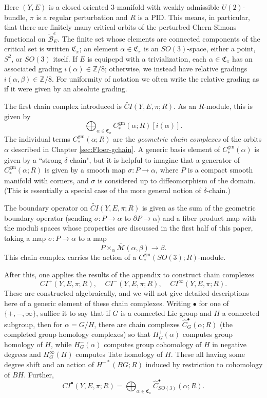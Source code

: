 \documentclass{memo-l}
\theoremstyle{definition}
\theoremstyle{remark}
\numberwithin{section}{chapter}
\numberwithin{equation}{chapter}
\begin{document}
Here $(Y,E)$ is a closed oriented 3-manifold with weakly admissible $U(2)$-bundle, $\pi$ is a regular perturbation and $R$ is a PID. This means, in particular, that there are finitely many critical orbits of the perturbed Chern-Simons functional on $\widetilde{\mathcal B}^e_E$. The finite set whose elements are connected components of the critical set is written $\mathfrak C_\pi$; an element $\alpha \in \mathfrak C_\pi$ is an $SO(3)$-space, either a point, $S^2$, or $SO(3)$ itself. If $E$ is equipepd with a trivialization, each $\alpha \in \mathfrak C_\pi$ has an associated grading $i(\alpha) \in \mathbb Z/8$; otherwise, we instead have relative gradings $i(\alpha, \beta) \in \mathbb Z/8$. For uniformity of notation we often write the relative grading as if it were given by an absolute grading.

The first chain complex introduced is $\widetilde{CI}(Y,E,\pi;R)$. As an $R$-module, this is given by $$\bigoplus_{\alpha \in \mathfrak C_\pi} C_*^{\text{gm}}(\alpha;R)[i(\alpha)].$$ The individual terms $C_*^{\text{gm}}(\alpha;R)$ are the \emph{geometric chain complexes} of the orbits $\alpha$ described in Chapter \ref{sec:Floer-gchain}. A generic basis element of $C_*^{\text{gm}}(\alpha)$ is given by a ``strong $\delta$-chain", but it is helpful to imagine that a generator of $C_*^{\text{gm}}(\alpha;R)$ is given by a smooth map $\sigma: P \to \alpha$, where $P$ is a compact smooth manifold with corners, and $\sigma$ is considered up to diffeomorphism of the domain. (This is essentially a special case of the more general notion of $\delta$-chain.) 

The boundary operator on $\widetilde{CI}(Y,E,\pi;R)$ is given as the sum of the geometric boundary operator (sending $\sigma: P\to \alpha$ to $\partial P \to \alpha$) and a fiber product map with the moduli spaces whose properties are discussed in the first half of this paper, taking a map $\sigma: P \to \alpha$ to a map 
\begin{equation}\label{eqn:fib-moduli}
  P \times_{\alpha} \overline{\mathcal M}(\alpha, \beta) \to \beta. 
\tag{*}
\end{equation}
This chain complex carries the action of a $C_*^{\text{gm}}(SO(3);R)$-module.

After this, one applies the results of the appendix to construct chain complexes $$CI^+(Y,E,\pi;R),\;\;\;\; CI^-(Y,E,\pi;R),\;\;\;\; CI^\infty(Y,E,\pi;R).$$ These are constructed algebraically, and we will not give detailed descriptions here of a generic element of these chain complexes. Writing $\bullet$ for one of $\{+, -, \infty\}$, suffice it to say that if $G$ is a connected Lie group and $H$ a connected subgroup, then for $\alpha = G/H$, there are chain complexes $\hat C^\bullet_G(\alpha;R)$ (the completed group homology complexes) so that $H^+_G(\alpha)$ computes group homology of $H$, while $H^-_G(\alpha)$ computes group cohomology of $H$ in negative degrees and $H^\infty_G(H)$ computes Tate homology of $H$. These all having some degree shift and an action of $H^{-*}(BG;R)$ induced by restriction to cohomology of $BH$. Further, $$CI^\bullet(Y,E,\pi;R) = \bigoplus_{\alpha \in \mathfrak C_\pi} \hat C^\bullet_{SO(3)}(\alpha;R).$$ 
\end{document}

